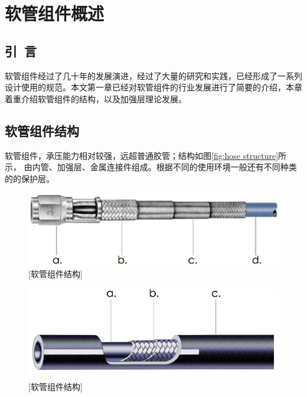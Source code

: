 
\chapter{软管组件概述}
\section{引~言}
软管组件经过了几十年的发展演进，经过了大量的研究和实践，已经形成了一系列设计使用的规范。本文第一章已经对软管组件的行业发展进行了简要的介绍，本章着重介绍软管组件的结构，以及加强层理论发展。

\section{软管组件结构}
软管组件，承压能力相对较强，远超普通胶管；结构如图\ref{fig:hose structure}所示，
由内管、加强层、金属连接件组成。根据不同的使用环境一般还有不同种类的的保护层。



\begin{figure}[!htbp]
	\centering
	\includegraphics[width=0.6\linewidth]{figure/chap1/Hose-Structure}
	[软管组件结构]
	\label{fig:hose structure-1}
\end{figure}

\begin{figure}[!htbp]
	\centering
	\includegraphics[width=0.6\linewidth]{figure/chap1/Parker-hose}
	[软管组件结构]
	\label{fig:hose structure-2}
\end{figure}

